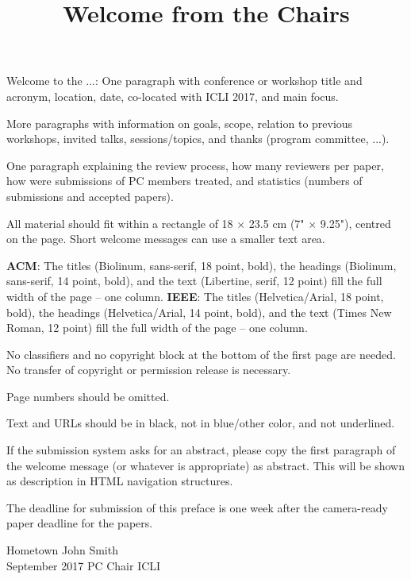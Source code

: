 \documentclass[12pt,letterpaper]{article}
\begin{document}
\title{\sffamily\bfseries Welcome from the Chairs}
\date{}

\maketitle
\thispagestyle{empty}
\pagestyle{empty}

Welcome to the ...: One paragraph with conference or workshop title and acronym, location, date, co-located with ICLI 2017, and main focus.

More paragraphs with information on goals, scope, relation to previous workshops, invited talks, sessions/topics, and thanks (program committee, ...).

One paragraph explaining the review process, how many reviewers per paper, how were submissions of PC members treated, and statistics (numbers of submissions and accepted papers).

All material should fit within a rectangle of 18 × 23.5 cm (7" × 9.25"), centred on the page. Short welcome messages can use a smaller text area.

\textbf{ACM}: The titles (Biolinum, sans-serif, 18 point, bold), the headings (Biolinum, sans-serif, 14 point, bold), 
and the text (Libertine, serif, 12 point) fill the full width of the page – one column.
\textbf{IEEE}: The titles (Helvetica/Arial, 18 point, bold), the headings (Helvetica/Arial, 14 point, bold), 
and the text (Times New Roman, 12 point) fill the full width of the page – one column.

No classifiers and no copyright block at the bottom of the first page are needed. No transfer of copyright or permission release is necessary.

Page numbers should be omitted.

Text and URLs should be in black, not in blue/other color, and not underlined.

If the submission system asks for an abstract, please copy the first paragraph of the welcome message (or whatever is appropriate) as abstract. This will be shown as description in HTML navigation structures.

The deadline for submission of this preface is one week after the camera-ready paper deadline for the papers.

\bigskip
\noindent
Hometown       \hfill John Smith\\
September 2017 \hfill PC Chair ICLI
\end{document}
